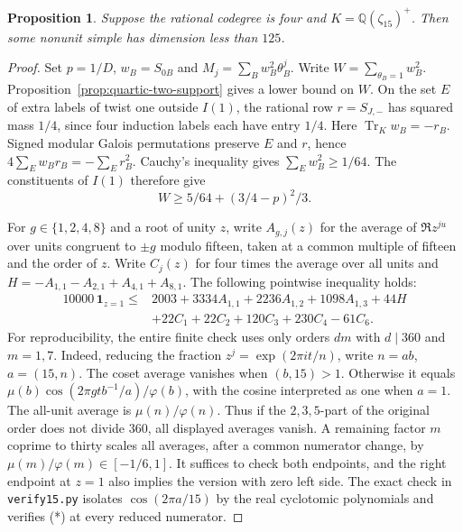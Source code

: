 \documentclass[11pt,a4paper]{article}
\newtheorem{proposition}[theorem]{Proposition}
\numberwithin{equation}{section}
\begin{document}
\begin{proposition}\label{prop:four-fifteen-bound}
Suppose the rational codegree is four and $K=\mathbb Q(\zeta_{15})^+$.
Then some nonunit simple has dimension less than $125$.
\end{proposition}
\begin{proof}
Set $p=1/D$, $w_B=S_{0B}$ and $M_j=\sum_Bw_B^2\theta_B^j$. Write
$W=\sum_{\theta_B=1}w_B^2$. Proposition~\ref{prop:quartic-two-support}
gives a lower bound on $W$. On the set $E$ of extra labels of twist one
outside $I(1)$, the rational row $r=S_{J,-}$ has squared mass $1/4$,
since four induction labels each have entry $1/4$. Here
$\operatorname{Tr}_K w_B=-r_B$. Signed modular Galois permutations
preserve $E$ and $r$, hence $4\sum_Ew_Br_B=-\sum_Er_B^2$. Cauchy's
inequality gives $\sum_Ew_B^2\ge1/64$. The constituents of $I(1)$
therefore give
\[
 W\ge 5/64+(3/4-p)^2/3 .
\]

For $g\in\{1,2,4,8\}$ and a root of unity $z$, write $A_{g,j}(z)$
for the average of $\Re z^{ju}$ over units congruent to $\pm g$
modulo fifteen, taken at a common multiple of fifteen and the order
of $z$. Write $C_j(z)$ for four times the average over all units
and $H=-A_{1,1}-A_{2,1}+A_{4,1}+A_{8,1}$. The following pointwise
inequality holds:
\[
\begin{split}
10000\,\mathbf1_{z=1}\le {}&2003+3334 A_{1,1}+2236 A_{1,2}
 +1098 A_{1,3}+44H\\
 &+22 C_1+22 C_2+120 C_3+230 C_4-61 C_6.
\end{split} \tag{*}
\]
For reproducibility, the entire finite check uses only orders $dm$
with $d\mid360$ and $m=1,7$. Indeed, reducing the fraction $z^j=
\exp(2\pi i t/n)$, write $n=ab$, $a=(15,n)$. The coset average
vanishes when $(b,15)>1$. Otherwise it equals
$\mu(b)\cos(2\pi g t b^{-1}/a)/\varphi(b)$, with the cosine interpreted
as one when $a=1$. The all-unit average is $\mu(n)/\varphi(n)$.
Thus if the $2,3,5$-part of the original order does not divide $360$,
all displayed averages vanish. A remaining factor $m$ coprime to
thirty scales all averages, after a common numerator change, by
$\mu(m)/\varphi(m)\in[-1/6,1]$. It suffices to check both endpoints,
and the right endpoint at $z=1$ also implies the version with zero
left side. The exact check in \texttt{verify15.py} isolates
$\cos(2\pi a/15)$ by the real cyclotomic polynomials and verifies (*) at
every reduced numerator.


\end{proof}
\end{document}
